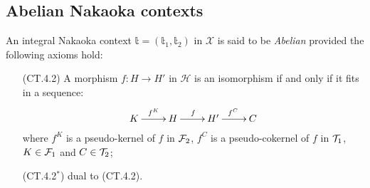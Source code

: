 \subsection{Abelian Nakaoka contexts}


\begin{definition}
An integral Nakaoka context $\mathbb{t}=(\mathbb{t}_1,\mathbb{t}_2)$ in $\mathcal{X}$ is said to be {\em Abelian} provided the following axioms hold:
\begin{enumerate}
\item[(CT.4.2)] A morphism $f\colon H\to H'$ in $\mathcal{H}$ is an isomorphism if and only if it fits in a sequence:
\[
\xymatrix{
K\ar[r]^{f^K}&H\ar[r]^f&H'\ar[r]^{f^C}&C
}
\]
where $f^K$ is a pseudo-kernel of $f$ in $\mathcal F_2$, $f^C$ is a pseudo-cokernel of $f$ in $\mathcal T_1$, $K\in \mathcal F_1$ and $C\in \mathcal T_2$;
\item[(CT.4.2$^*$)] dual to (CT.4.2).
\end{enumerate}
\end{definition}


